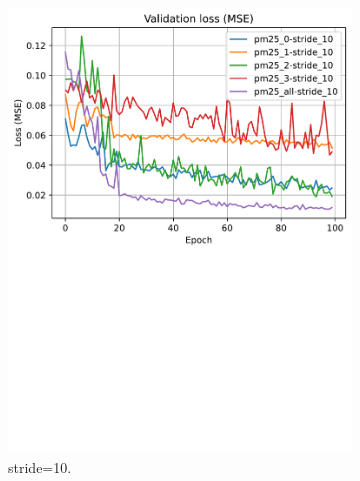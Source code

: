 \begin{figure}[!htbp]
    \centering
    \begin{subfigure}[!htbp]{.45\textwidth}
        \centering
        \includegraphics[width=\textwidth]{fig/results/val_curves_stride_10.pdf}
        \caption{stride=10.}
        \label{fig:val_stride_10}
    \end{subfigure}
    \hfill
    \begin{subfigure}[!htbp]{.45\textwidth}
        \centering

\end{subfigure}
\end{figure}
